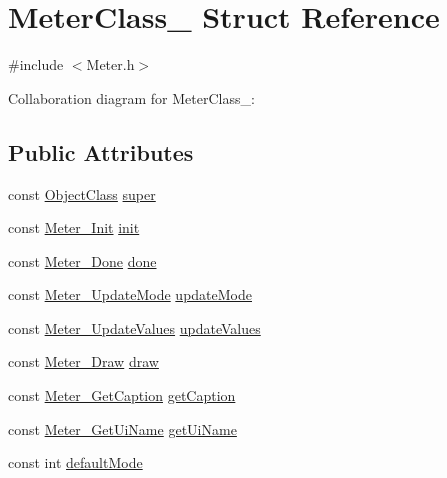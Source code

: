 \hypertarget{structMeterClass__}{}\section{Meter\+Class\+\_\+ Struct Reference}
\label{structMeterClass__}


{\ttfamily \#include $<$Meter.\+h$>$}



Collaboration diagram for Meter\+Class\+\_\+\+:
\subsection*{Public Attributes}
\begin{DoxyCompactItemize}
\item 
const \hyperlink{Object_8h_a6feb151c3b8f61fae503dfbcdc3d6a54}{Object\+Class} \hyperlink{structMeterClass___a445fae9739e572c304a42de982028414}{super}
\item 
const \hyperlink{Meter_8h_a55e4a59fa1b152ff9fe9b3f5831834ac}{Meter\+\_\+\+Init} \hyperlink{structMeterClass___a530d858c0125e544f719f0548ffda09c}{init}
\item 
const \hyperlink{Meter_8h_a6dcd5a8e6cddc364f96e58fa404dde27}{Meter\+\_\+\+Done} \hyperlink{structMeterClass___a6bf80edb0f209e7fe5c9dd128b8101b8}{done}
\item 
const \hyperlink{Meter_8h_af9d3680496082005293171c69205d7f0}{Meter\+\_\+\+Update\+Mode} \hyperlink{structMeterClass___a08c8c40945cb0e8754e3adb23ba330f5}{update\+Mode}
\item 
const \hyperlink{Meter_8h_a2fcefaa066b00a9727359f6af1d02f0e}{Meter\+\_\+\+Update\+Values} \hyperlink{structMeterClass___a716f354159b5774d1d8100a3905aa8dc}{update\+Values}
\item 
const \hyperlink{Meter_8h_af2bfba1e0c54d7d0dc0511e1805b1725}{Meter\+\_\+\+Draw} \hyperlink{structMeterClass___a7a277086dd216ad611514d63719c2720}{draw}
\item 
const \hyperlink{Meter_8h_a9396e4eaee9a298a89686163b2415d4a}{Meter\+\_\+\+Get\+Caption} \hyperlink{structMeterClass___ae2dc15ce1c7ba8e0547f3464934e2d88}{get\+Caption}
\item 
const \hyperlink{Meter_8h_a6ae13068f393c3c786b82e19cc327546}{Meter\+\_\+\+Get\+Ui\+Name} \hyperlink{structMeterClass___a4c21a164d0f75f7e9ea706d1018b26b5}{get\+Ui\+Name}
\item 
const int \hyperlink{structMeterClass___af8b7aa060c25dbcca9361ae95eacf668}{default\+Mode}
\item 

\end{DoxyCompactItemize}
